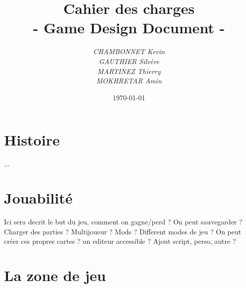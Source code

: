 \documentclass[a4paper]{article}
\title{Cahier des charges\\- Game Design Document -}
\author{\emph{CHAMBONNET Kevin}\\\emph{GAUTHIER Silvère}\\\emph{MARTINEZ Thierry}\\\emph{MOKHRETAR Amin}}
\date{\today}
\begin{document}
\maketitle




\section*{Histoire}

...

\section*{Jouabilité}

Ici sera decrit le but du jeu, comment on gagne/perd ?
On peut sauvegarder ? Charger des parties ?
Multijoueur ? Mods ?
Different modes de jeu ?
On peut créer ces propres cartes ? un editeur accessible ?
Ajout script, perso, autre ?

\section*{La zone de jeu}
\end{document}
